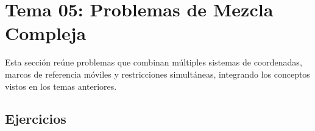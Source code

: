 
\section{Tema 05: Problemas de Mezcla Compleja}

Esta sección reúne problemas que combinan múltiples sistemas de coordenadas,
marcos de referencia móviles y restricciones simultáneas, integrando los
conceptos vistos en los temas anteriores.

\subsection{Ejercicios}


\clearpage

\clearpage

\clearpage



%
